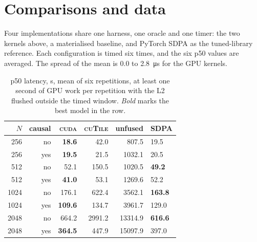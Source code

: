 \documentclass[10pt,a4paper]{article}
\newcommand{\cuda}{\textsc{cuda}}
\newcommand{\ctile}{\textsc{cuTile}}
\begin{document}
\section{Comparisons and data}\label{sec:data}

Four implementations share one harness, one oracle and one timer: the two kernels above, a materialised
baseline, and PyTorch SDPA as the tuned-library reference. Each configuration is timed six times, and
the six p50 values are averaged. The spread of the mean is 0.0 to \SI{2.8}{\micro\second} for the GPU
kernels.

\begin{table}[H]
\centering\small
\caption{p50 latency, \textmu s, mean of six repetitions, at least one second of GPU work per
repetition with the L2 flushed outside the timed window. \emph{Bold} marks the best model in the row.}
\label{tab:perf}
\begin{tabular}{@{}rrrrrl@{}}
\toprule
$N$ & causal & \cuda{} & \ctile{} & unfused & SDPA \\
\midrule
256 & no & \textbf{18.6} & 42.0 & 807.5 & 19.5 \\
256 & yes & \textbf{19.5} & 21.5 & 1032.1 & 20.5 \\
512 & no & 52.1 & 150.5 & 1020.5 & \textbf{49.2} \\
512 & yes & \textbf{41.0} & 53.1 & 1269.6 & 52.2 \\
1024 & no & 176.1 & 622.4 & 3562.1 & \textbf{163.8} \\
1024 & yes & \textbf{109.6} & 134.7 & 3961.7 & 129.0 \\
2048 & no & 664.2 & 2991.2 & 13314.9 & \textbf{616.6} \\
2048 & yes & \textbf{364.5} & 447.9 & 15097.9 & 397.0 \\
\bottomrule
\end{tabular}
\end{table}
\end{document}
